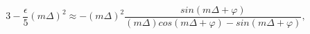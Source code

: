 \begin{equation}
3-\frac{\epsilon}{5} (m \Delta)^2 \approx -(m \Delta)^2 \frac{sin( m \Delta+\varphi)}
{ (m \Delta)cos(m \Delta+\varphi)-sin(m \Delta+\varphi)},
 \end{equation}

